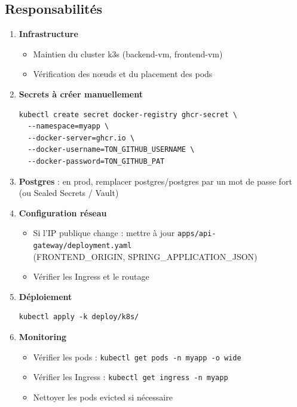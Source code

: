 \documentclass[11pt,a4paper]{article}
\begin{document}
\subsection{Responsabilités}

\begin{enumerate}
  \item \textbf{Infrastructure}
  \begin{itemize}[noitemsep]
    \item Maintien du cluster k3s (backend-vm, frontend-vm)
    \item Vérification des nœuds et du placement des pods
  \end{itemize}

  \item \textbf{Secrets à créer manuellement}
  \begin{lstlisting}
kubectl create secret docker-registry ghcr-secret \
  --namespace=myapp \
  --docker-server=ghcr.io \
  --docker-username=TON_GITHUB_USERNAME \
  --docker-password=TON_GITHUB_PAT
  \end{lstlisting}

  \item \textbf{Postgres} : en prod, remplacer postgres/postgres par un mot de passe fort (ou Sealed Secrets / Vault)

  \item \textbf{Configuration réseau}
  \begin{itemize}[noitemsep]
    \item Si l’IP publique change : mettre à jour \texttt{apps/api-gateway/deployment.yaml} \\
    (FRONTEND\_ORIGIN, SPRING\_APPLICATION\_JSON)
    \item Vérifier les Ingress et le routage
  \end{itemize}

  \item \textbf{Déploiement}
  \begin{lstlisting}
kubectl apply -k deploy/k8s/
  \end{lstlisting}

  \item \textbf{Monitoring}
  \begin{itemize}[noitemsep]
    \item Vérifier les pods : \texttt{kubectl get pods -n myapp -o wide}
    \item Vérifier les Ingress : \texttt{kubectl get ingress -n myapp}
    \item Nettoyer les pods evicted si nécessaire
  \end{itemize}
\end{enumerate}
\end{document}
